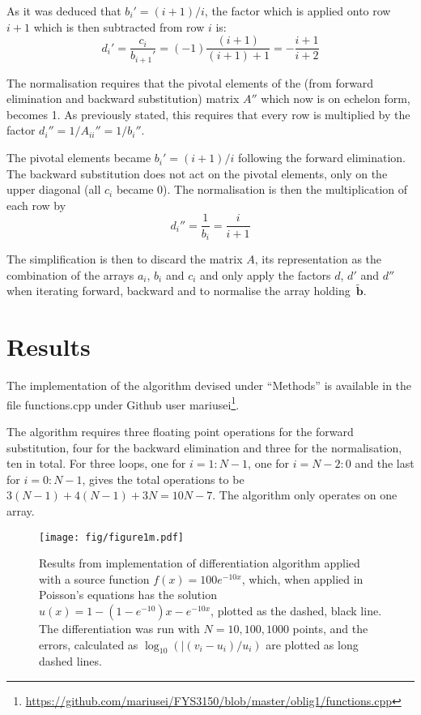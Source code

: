 \documentclass[a4paper,11pt]{article}
\begin{document}
    As it was deduced that $b_i' = (i+1)/i$, the factor which is applied onto row $i+1$ which is then subtracted from row $i$ is:
    \[ d_i' = \frac{c_{i}}{b_{i+1}'} = (-1) \frac{(i+1)}{(i+1) + 1} = -\frac{i+1}{i+2} \]

    The normalisation requires that the pivotal elements of the (from forward elimination and backward substitution) matrix $A''$ which now is on echelon form, becomes 1. As previously stated, this requires that every row is multiplied by the factor $d_i'' = 1/A_{ii}'' = 1/b_i''$. 

    The pivotal elements became $b_i' = (i+1)/i$ following the forward elimination. The backward substitution does not act on the pivotal elements, only on the upper diagonal (all $c_i$ became 0). The normalisation is then the multiplication of each row by
    \[ d_i'' = \frac{1}{b_i} = \frac{i}{i+1} \]

    The simplification is then to discard the matrix $A$, its representation as the combination of the arrays $a_i$, $b_i$ and $c_i$ and only apply the factors $d$, $d'$ and $d''$ when iterating forward, backward and to normalise the array holding~$\tilde{\mathbf{b}}$. 

\section{Results}
    The implementation of the algorithm devised under ``Methods'' is available in the file \textrm{functions.cpp} under Github user \textrm{mariusei}\footnote{\url{https://github.com/mariusei/FYS3150/blob/master/oblig1/functions.cpp}}.

   The algorithm requires three floating point operations for the forward substitution, four for the backward elimination and three for the normalisation, ten in total. For three loops, one for $i=1:N-1$, one for $i=N-2:0$ and the last for $i=0:N-1$, gives the total operations to be $3(N-1) + 4(N-1) + 3N = 10N -7$. The algorithm only operates on one array.

    \begin{figure}[htb]
        \centering
        \texttt{[image: fig/figure1m.pdf]}
        \caption{Results from implementation of differentiation algorithm applied with a source function $f(x) = 100 e^{-10x}$, which, when applied in Poisson's equations has the solution $u(x) = 1-\left( 1-e^{-10} \right)x - e^{-10x}$, plotted as the dashed, black line. The differentiation was run with $N=10,100,1000$ points, and the errors, calculated as $\log_{10} \left( |(v_i - u_i)/u_i \right)$ are plotted as long dashed lines.}
        \label{fig:res}
    \end{figure}
\end{document}
